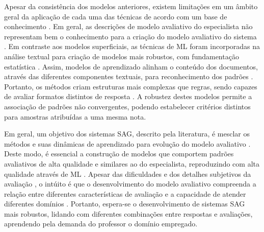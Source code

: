 Apesar da consistência dos modelos anteriores, existem limitações em um âmbito geral da aplicação de cada uma das técnicas de acordo com um base de conhecimento \cite{riordan2019, ding2020}. Em geral, as descrições de modelo avaliativo do especialista não representam bem o conhecimento para a criação do modelo avaliativo do sistema \cite{filighera2020}. Em contraste aos modelos superficiais, as técnicas de ML foram incorporadas na análise textual para criação de modelos mais robustos, com fundamentação estatística \cite{galhardi2018b}. Assim, modelos de aprendizado alinham o conteúdo dos documentos, através das diferentes componentes textuais, para reconhecimento dos padrões \cite{suzen2020}. Portanto, os métodos criam estruturas mais complexas que regras, sendo capazes de avaliar formatos distintos de resposta \cite{zhang2016, saha2019, camus2020}. A robustez destes modelos permite a associação de padrões não convergentes, podendo estabelecer critérios distintos para amostras atribuídas a uma mesma nota.

Em geral, um objetivo dos sistemas SAG, descrito pela literatura, é mesclar os métodos e suas dinâmicas de aprendizado para evolução do modelo avaliativo \cite{burrows2015, zesch2018}. Deste modo, é essencial a construção de modelos que comportem padrões avaliativos de alta qualidade e similares ao do especialista, reproduzindo com alta qualidade através de ML \cite{jordan2012}. Apesar das dificuldades e dos detalhes subjetivos da avaliação \cite{roy2018}, o intúito é que o desenvolvimento do modelo avaliativo compreenda a relação entre diferentes características de avaliação e a capacidade de atender diferentes domínios \cite{sung2019a, saha2019}. Portanto, espera-se o desenvolvimento de sistemas SAG mais robustos, lidando com diferentes combinações entre respostas e avaliações, aprendendo pela demanda do professor o domínio empregado.